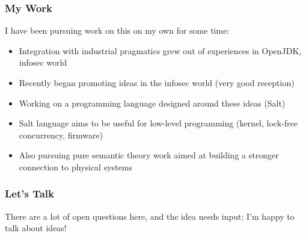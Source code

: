 \documentclass{beamer}
\begin{document}
\begin{frame}
  \frametitle{My Work}
  I have been pursuing work on this on my own for some time:
  \begin{itemize}
    \item Integration with industrial pragmatics grew out of
      experiences in OpenJDK, infosec world
    \item Recently began promoting ideas in the infosec world (very
      good reception)
    \item Working on a programming language designed around these ideas (Salt)
    \item Salt language aims to be useful for low-level programming
      (kernel, lock-free concurrency, firmware)
    \item Also pursuing pure semantic theory work aimed at building a
      stronger connection to physical systems
  \end{itemize}
\end{frame}

\begin{frame}
  \frametitle{Let's Talk}

  There are a lot of open questions here, and the idea needs input;
  I'm happy to talk about ideas!
\end{frame}
\end{document}
